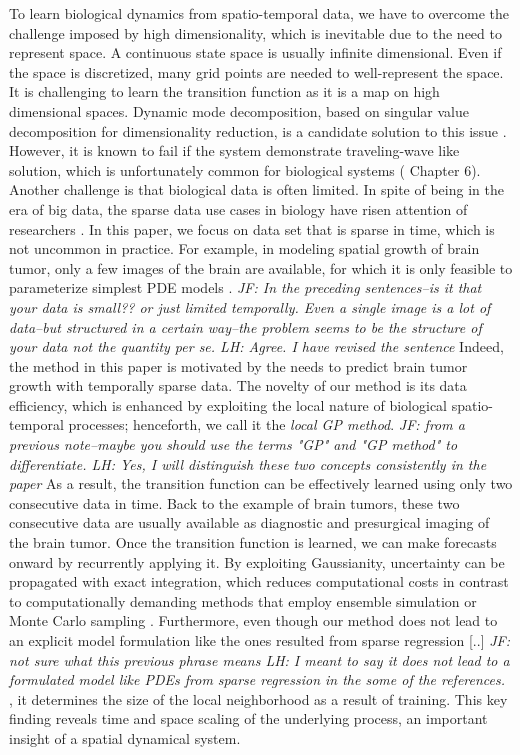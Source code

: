 \documentclass[smallextended,natbib]{svjour3}       %
\begin{document}
To learn biological dynamics from spatio-temporal data, we have to overcome the challenge imposed by high dimensionality, which is inevitable due to the need to represent space. A continuous state space is usually infinite dimensional. Even if the space is discretized, many grid points are needed to well-represent the space. It is challenging to learn the transition function as it is a map on high dimensional spaces. Dynamic mode decomposition, based on singular value decomposition for dimensionality reduction, is a candidate solution to this issue \citep{schmid2010dynamic}. However, it is known to fail if the system demonstrate traveling-wave like solution, which is unfortunately common for biological systems (\citep{Brunton2019} Chapter 6). Another challenge is that biological data is often limited. In spite of being in the era of big data, the sparse data use cases in biology have risen attention of researchers \citep{Lagergren2020}. In this paper, we focus on data set that is sparse in time, which is not uncommon in practice. For example, in modeling spatial growth of brain tumor, only a few images of the brain are available, for which it is only feasible to parameterize simplest PDE models \citep{Han2019b,lipkova2019personalized,McDaniel2013}. \emph{JF: In the preceding sentences--is it that your data is small??  or just limited temporally.  Even a single image is a lot of data--but structured in a certain way--the problem seems to be the structure of your data not the quantity per se. LH: Agree. I have revised the sentence} Indeed, the method in this paper is motivated by the needs to predict brain tumor growth with temporally sparse data. The novelty of our method is its data efficiency, which is enhanced by exploiting the local nature of biological spatio-temporal processes; henceforth, we call it the \emph{local GP method}.  \emph{JF: from a previous note--maybe you should use the terms "GP" and "GP method" to differentiate. LH: Yes, I will distinguish these two concepts consistently in the paper} As a result, the transition function can be effectively learned using only two consecutive data in time. Back to the example of brain tumors, these two consecutive data are usually available as diagnostic and presurgical imaging of the brain tumor. Once the transition function is learned, we can make forecasts onward by recurrently applying it. By exploiting Gaussianity, uncertainty can be propagated with exact integration, which reduces computational costs in contrast to computationally demanding methods that employ ensemble simulation or Monte Carlo sampling \citep{lipkova2019personalized,McDaniel2013}. Furthermore, even though our method does not lead to an explicit model formulation like the ones resulted from sparse regression [..] \emph{JF: not sure what this previous phrase means LH: I meant to say it does not lead to a formulated model like PDEs from sparse regression in the some of the references. }, it determines the size of the local neighborhood as a result of training. This key finding reveals time and space scaling of the underlying process, an important insight of a spatial dynamical system.  
               
\end{document}
